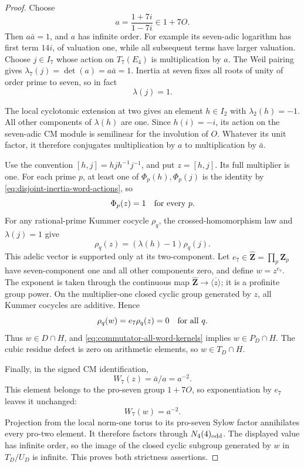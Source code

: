 \begin{proof}
Choose
\[
             a=\frac{1+7i}{1-7i}\in1+7O.
\]
Then \(a\bar a=1\), and \(a\) has infinite order.  For
example its seven-adic logarithm has first term \(14i\),
of valuation one, while all subsequent terms have larger
valuation.  Choose \(j\in I_7\) whose action on \(T_7(E_4)\)
is multiplication by \(a\).  The Weil pairing gives
\(\lambda_7(j)=\det(a)=a\bar a=1\).  Inertia at seven
fixes all roots of unity of order prime to seven, so in fact
\begin{equation}\label{eq:inertia-seven-full-multiplier}
                              \lambda(j)=1.
\end{equation}

The local cyclotomic extension at two gives an element
\(h\in I_2\) with \(\lambda_2(h)=-1\).
All other components of \(\lambda(h)\) are one.
Since \(h(i)=-i\), its action on the seven-adic CM module
is semilinear for the involution of \(O\).  Whatever its
unit factor, it therefore conjugates multiplication by
\(a\) to multiplication by \(\bar a\).

Use the convention \([h,j]=h j h^{-1}j^{-1}\), and put
\(z=[h,j]\).  Its full multiplier is one.  For each prime
\(p\), at least one of \(\Phi_p(h),\Phi_p(j)\) is the
identity by \eqref{eq:disjoint-inertia-word-actions}, so
\begin{equation}\label{eq:commutator-all-word-kernels}
                           \Phi_p(z)=1\quad\hbox{for every }p.
\end{equation}
For any rational-prime Kummer cocycle \(\rho_q\), the
crossed-homomorphism law and \(\lambda(j)=1\) give
\[
              \rho_q(z)=(\lambda(h)-1)\rho_q(j).
\]
This adelic vector is supported only at its two-component.
Let \(e_7\in\widehat{\mathbf Z}=\prod_p\mathbf Z_p\)
have seven-component one and all other components zero,
and define \(w=z^{e_7}\).  The exponent is taken through
the continuous map
\(\widehat{\mathbf Z}\to\overline{\langle z\rangle}\);
it is a profinite group power.  On the multiplier-one
closed cyclic group generated by \(z\), all Kummer
cocycles are additive.  Hence
\[
                  \rho_q(w)=e_7\rho_q(z)=0\quad\hbox{for all }q.
\]
Thus \(w\in D\cap H\), and
\eqref{eq:commutator-all-word-kernels} implies
\(w\in P_D\cap H\).  The cubic residue defect is zero
on arithmetic elements, so \(w\in T_D\cap H\).

Finally, in the signed CM identification,
\[
                    W_7(z)=\bar a/a=a^{-2}.
\]
This element belongs to the pro-seven group \(1+7O\),
so exponentiation by \(e_7\) leaves it unchanged:
\[
                         W_7(w)=a^{-2}.
\]
Projection from the local norm-one torus to its pro-seven
Sylow factor annihilates every pro-two element.  It
therefore factors through \(N_4(4)_{\rm odd}\).
The displayed value has infinite order, so the image of
the closed cyclic subgroup generated by \(w\) in
\(T_D/U_D\) is infinite.  This proves both strictness
assertions.
\end{proof}
